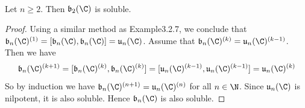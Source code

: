 \documentclass[a4paper]{article}
\begin{document}
\begin{eg}{}{} \\Let $n\geq 2$. Then $\mathfrak{b}_2(\C)$ is soluble. 
\begin{proof}
Using a similar method as Example3.2.7, we conclude that $\mathfrak{b}_n(\C)^{(1)}=[\mathfrak{b}_n(\C),\mathfrak{b}_n(\C)]=\mathfrak{u}_n(\C)$. Assume that $\mathfrak{b}_n(\C)^{(k)}=\mathfrak{u}_n(\C)^{(k-1)}$. Then we have $$\mathfrak{b}_n(\C)^{(k+1)}=[\mathfrak{b}_n(\C)^{(k)},\mathfrak{b}_n(\C)^{(k)}]=[\mathfrak{u}_n(\C)^{(k-1)},\mathfrak{u}_n(\C)^{(k-1)}]=\mathfrak{u}_n(\C)^{(k)}$$ So by induction we have $\mathfrak{b}_n(\C)^{(n+1)}=\mathfrak{u}_n(\C)^{(n)}$ for all $n\in\N$. Since $\mathfrak{u}_n(\C)$ is nilpotent, it is also soluble. Hence $\mathfrak{b}_n(\C)$ is also soluble. 
\end{proof}
\end{eg}
\end{document}
